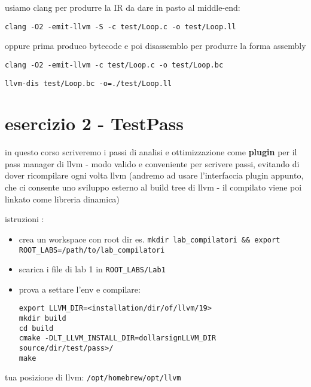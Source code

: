 \begin{emphasize}
    usiamo clang per produrre la IR da dare in pasto al middle-end:

    \lstinline|clang -O2 -emit-llvm -S -c test/Loop.c -o test/Loop.ll|

    oppure prima produco bytecode e poi disassemblo per produrre la forma assembly

    \lstinline|clang -O2 -emit-llvm -c test/Loop.c -o test/Loop.bc|

    \lstinline|llvm-dis test/Loop.bc -o=./test/Loop.ll|
\end{emphasize}

\section{esercizio 2 - TestPass}

in questo corso scriveremo i passi di analisi e ottimizzazione come \textbf{plugin} per il pass manager di llvm - modo valido e conveniente per scrivere passi, evitando di dover ricompilare ogni volta llvm (andremo ad usare l'interfaccia plugin appunto, che ci consente uno sviluppo esterno al build tree di llvm - il compilato viene poi linkato come libreria dinamica)

\begin{emphasize-blue}
   istruzioni :
   \begin{itemize}
     \item crea un workspace con root dir es. \lstinline|mkdir lab_compilatori && export ROOT_LABS=/path/to/lab_compilatori| 
     \item scarica i file di lab 1 in \lstinline|ROOT_LABS/Lab1|
     \item prova a settare l'env e compilare: 
       \begin{lstlisting}
export LLVM_DIR=<installation/dir/of/llvm/19>
mkdir build
cd build
cmake -DLT_LLVM_INSTALL_DIR=dollarsignLLVM_DIR
source/dir/test/pass>/
make\end{lstlisting}
     
   \end{itemize}
\end{emphasize-blue}

\begin{emphasize}
    tua posizione di llvm: \lstinline|/opt/homebrew/opt/llvm|
\end{emphasize}

